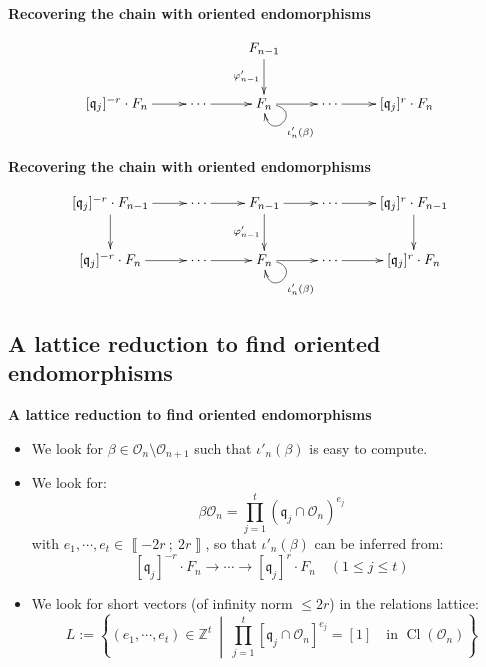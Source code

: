 \documentclass[10pt]{beamer}
\theoremstyle{plain}
\theoremstyle{definition}
\newcommand{\Z}{\mathbb{Z}}
\newcommand{\mO}{\mathcal{O}}
\renewcommand{\i}[2]{\left\llbracket #1~;~#2\right\rrbracket}
\renewcommand{\(}{\left(}
\renewcommand{\)}{\right)}
\newcommand{\mf}[1]{\mathfrak{#1}}
\newcommand{\mfq}{\mathfrak{q}}
\DeclareMathOperator{\Cl}{Cl}
\begin{document}
\begin{frame}
\textbf{Recovering the chain with oriented endomorphisms}

\vspace{0.5cm}

\[\xymatrix{
 										      &                     & F_{n-1} \ar[d]_{\varphi'_{n-1}} & &\\ 
[\mf{q}_j]^{-r}\cdot F_n \ar[r] & \cdots \ar[r]& F_n \ar@(r,d)[]^{\iota'_n(\beta)} \ar[r] & \cdots \ar[r]& [\mf{q}_j]^r\cdot F_n\\
}\]
\end{frame}

\begin{frame}
\textbf{Recovering the chain with oriented endomorphisms}

\vspace{0.5cm}

\[\xymatrix{
 [\mf{q}_j]^{-r}\cdot F_{n-1} \ar[r] \ar[d] &  \cdots \ar[r] & F_{n-1} \ar[d]_{\varphi'_{n-1}} \ar[r] &\cdots \ar[r] & [\mf{q}_j]^r\cdot F_{n-1} \ar[d]\\ 
[\mf{q}_j]^{-r}\cdot F_n \ar[r] & \cdots \ar[r]& F_n \ar@(r,d)[]^{\iota'_n(\beta)} \ar[r] & \cdots \ar[r]& [\mf{q}_j]^r\cdot F_n\\
}\]
\end{frame}

\subsection{A lattice reduction to find oriented endomorphisms}

\begin{frame}
\textbf{A lattice reduction to find oriented endomorphisms}

\vspace{0.5cm}

\begin{itemize}
\item We look for $\beta\in \mO_n\setminus\mO_{n+1}$ such that $\iota'_n(\beta)$ is easy to compute.

\item We look for:
\[\beta\mO_n=\prod_{j=1}^t (\mf{q}_j\cap\mO_n)^{e_j}\]
with $e_1,\cdots, e_t\in\i{-2r}{2r}$, so that  $\iota'_n(\beta)$ can be inferred from:
\[[\mfq_j]^{-r}\cdot F_{n}\longrightarrow \cdots\longrightarrow [\mfq_j]^{r}\cdot F_{n} \quad (1\leq j\leq t)\]

\item We look for short vectors (of infinity norm $\leq 2r$) in the relations lattice:
\[L:=\left\{(e_1,\cdots,e_t)\in\Z^t \ \middle| \ \prod_{j=1}^t [\mf{q}_j\cap\mO_n]^{e_j}=[1] \quad\mbox{in } \Cl(\mO_n)\right\}\]
\end{itemize}
\end{frame}
\end{document}
